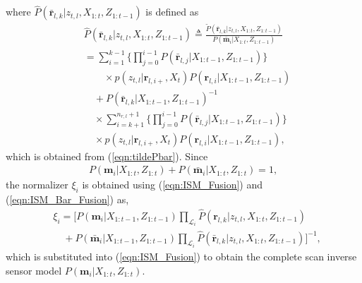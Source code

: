 \documentclass[letterpaper, 10pt, conference]{ieeeconf}
\newcommand{\refeqn}[1]{(\ref{eqn:#1})}
\begin{document}
where $\hat P(\bar{\mathbf{r}}_{l,k}|z_{t,l},X_{1:t},Z_{1:t-1})$ is defined as
\begin{align}
&\hat P(\bar{\mathbf{r}}_{l,k}|z_{t,l},X_{1:t},Z_{1:t-1})
\triangleq\frac{\tilde P(\bar{\mathbf{r}}_{l,k}|z_{t,l},X_{1:t},Z_{1:t-1})}{P(\bar{\mathbf{m}}_i|X_{1:t},Z_{1:t-1})}
\nonumber\\
&=\sum_{i=1}^{k-1}\bigg\{\prod_{j=0}^{i-1}P(\bar{\mathbf{r}}_{l,j}|X_{1:t-1},Z_{1:t-1})\bigg\}\nonumber\\&\quad\quad\times p(z_{t,l}|\mathbf{r}_{l,i+},X_t)P(\mathbf{r}_{l,i}|X_{1:t-1},Z_{1:t-1})
\nonumber
\\
&\quad
+P(\bar{\mathbf{r}}_{l,k}|X_{1:t-1},Z_{1:t-1})^{-1}
\nonumber\\&\quad\times 
\sum_{i=k+1}^{n_{r,l}+1}\bigg\{\prod_{j=0}^{i-1}P(\bar{\mathbf{r}}_{l,j}|X_{1:t-1},Z_{1:t-1})\bigg\}\nonumber\\&\quad\times p(z_{t,l}|\mathbf{r}_{l,i+},X_t)P(\mathbf{r}_{l,i}|X_{1:t-1},Z_{1:t-1}),
\end{align}
which is obtained from \refeqn{tildePbar}. %
Since 
\begin{align*}
P(\mathbf{m}_i|X_{1:t},Z_{1:t})+P(\bar{\mathbf{m}}_i|X_{1:t},Z_{1:t})=1,
\end{align*}
the normalizer $\xi_i$ is obtained using \refeqn{ISM_Fusion} and \refeqn{ISM_Bar_Fusion} as,
\begin{align}
&\xi_i=
\bigg[
P(\mathbf{m}_i|{X_{1:t-1}},Z_{1:t-1})
\prod_{\mathcal L_i}
\hat P(\mathbf{r}_{l,k}|z_{t,l},{X_{1:t}},Z_{1:t-1})
\nonumber\\&\quad
+
P(\bar{\mathbf{m}}_i|{X_{1:t-1}},Z_{1:t-1})
\prod_{\mathcal L_i}
\hat P(\bar{\mathbf{r}}_{l,k}|z_{t,l},X_{1:t},Z_{1:t-1})
\bigg]^{-1},\label{eqn:xi}
\end{align}
which is substituted into \refeqn{ISM_Fusion} to obtain the complete scan inverse sensor model $P(\mathbf{m}_i|X_{1:t},Z_{1:t})$.

\end{document}

